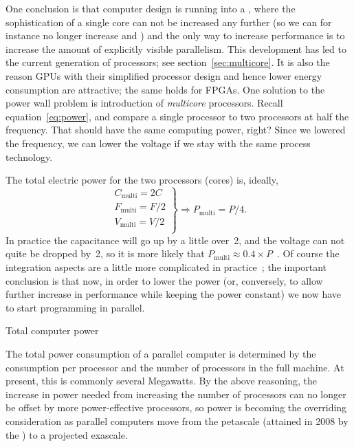 One conclusion is that computer design
is running into a , where the sophistication
of a single core can not be increased any further (so we can for
instance no longer increase  and
) and the only way to increase
performance is to increase the amount of explicitly visible
parallelism. This development has led to the current generation of
 processors; see section~\ref{sec:multicore}. It
is also the reason \acp{GPU} with their simplified processor design
and hence lower energy consumption
are attractive; the same holds for \acp{FPGA}.
One solution to the power wall problem is introduction
of \emph{multicore} processors.
Recall equation~\ref{eq:power}, and compare a single processor to two 
processors at half the frequency. That should have the same computing power, right?
Since we lowered the frequency, we can lower the voltage if we stay with the same 
process technology.

The total electric power for the two processors (cores) is, ideally,
\[ \left.
\begin{array}{c}
C_{\mathrm{multi}} = 2C\\
F_{\mathrm{multi}} = F/2\\
V_{\mathrm{multi}} = V/2\\
\end{array}\right\} \Rightarrow
P_{\mathrm{multi}} = P/4.
\]
In practice the capacitance will go up by a little over~2, and the
voltage can not quite be dropped by~2, so it is more likely that
$P_{\mathrm{multi}} \approx 0.4\times
P$~\cite{Chandrakasa:transformations}.  Of course the integration
aspects are a little more complicated in
practice~\cite{Bohr:ISSCC2009}; the important conclusion is that now,
in order to lower the power (or, conversely, to allow further increase
in performance while keeping the power constant) we now have to start
programming in parallel.

 {Total computer power}

The total power consumption of a parallel computer is determined by
the consumption per processor and the number of processors in the full
machine. At present, this is commonly several Megawatts. By the above
reasoning, the increase in power needed from increasing the number of
processors can no longer be offset by more power-effective processors,
so power is becoming the overriding consideration as parallel
computers move from the petascale (attained in 2008 by the
) to a projected exascale.


